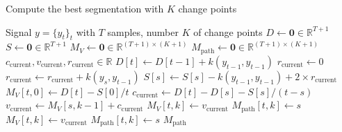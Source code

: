\documentclass[12pt]{article}
\newcommand\RR{\mathbb{R}}
\begin{document}
\begin{algorithm}
    \small
    \caption{Compute the best segmentation with $K$ change points} %
    \label{alg:dynp} %
    \begin{algorithmic} %
        \REQUIRE Signal $y = \{y_t\}_t$ with $T$ samples, number $K$ of change points
        \STATE {}
        \STATE $D \gets \bm{0}\in\mathbb{R}^{T+1}$ 
        \STATE $S \gets \bm{0}\in\mathbb{R}^{T+1}$ 
        \STATE $M_V \gets \bm{0}\in\mathbb{R}^{(T+1)\times (K+1)}$ 
        \STATE $M_{\text{path}} \gets \bm{0}\in\mathbb{R}^{(T+1)\times (K+1)}$ 
        \STATE $c_{\text{current}}, v_{\text{current}}, r_{\text{current}}\in\RR$ 
        \STATE
        \STATE {}
        \STATE
        \STATE {}
        \STATE $D[t] \gets D[t-1] + k(y_{t-1}, y_{t-1})$ 
        \STATE
        \STATE {}
        \STATE $r_{\text{current}}\gets0$
        \STATE $r_{\text{current}} \gets r_{\text{current}} + k(y_{s}, y_{t-1})$ 
        \STATE $S[s] \gets S[s] - k(y_{t-1}, y_{t-1}) + 2\times r_{\text{current}}$ 
        \ENDFOR
        \STATE
        \STATE {}
        \STATE $M_{V}[t, 0] \gets D[t] - S[0]/t$ 
        \STATE $c_{\text{current}} \gets D[t]-D[s] - S[s]/(t-s)$ 
        \STATE $v_{\text{current}} \gets M_V[s, k-1] + c_{\text{current}}$ 
        \STATE $M_V[t, k] \gets v_{\text{current}}$
        \STATE $M_{\text{path}}[t, k] \gets s$
        \ELSE
        \STATE $M_V[t, k] \gets v_{\text{current}}$
        \STATE $M_{\text{path}}[t, k] \gets s$
        \ENDIF
        \ENDIF
        \ENDFOR
        \ENDFOR
        \ENDFOR
        \RETURN $M_{\text{path}}$
    \end{algorithmic}
\end{algorithm}
\end{document}
